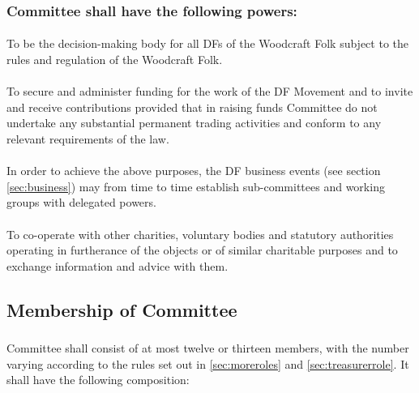 \documentclass[a4paper, 12pt]{article}
\begin{document}
\subsubsection{Committee shall have the following powers:}
\paragraph{}
To be the decision-making body for all DFs of the Woodcraft Folk subject to the rules and regulation of the Woodcraft Folk.
\paragraph{}
To secure and administer funding for the work of the DF Movement and to invite and receive contributions provided that in raising funds Committee do not undertake any substantial permanent trading activities and conform to any relevant requirements of the law.
\paragraph{}
In order to achieve the above purposes, the DF business events (see section \ref{sec:business}) may from time to time establish sub-committees and working groups with delegated powers.
\paragraph{}
To co-operate with other charities, voluntary bodies and statutory authorities operating in furtherance of the objects or of similar charitable purposes and to exchange information and advice with them.

\subsection{Membership of Committee}
\subsubsection{}
\label{sec:cttemembership}
Committee shall consist of at most twelve or thirteen members, with the number varying according to the rules set out in \ref{sec:moreroles} and \ref{sec:treasurerrole}. It shall have the following composition:
\end{document}

